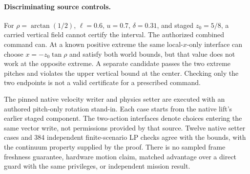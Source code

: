 \documentclass{article}
\begin{document}
\paragraph{Discriminating source controls.}
For $\rho=\arctan(1/2)$, $\ell=0.6$, $u=0.7$,
$\delta=0.31$, and staged $z_0=5/8$, a carried vertical field
cannot certify the interval. The authorized combined command
can. At a known positive extreme the same local-$x$-only
interface can choose $x=-z_0\tan\rho$ and satisfy both world
bounds, but that value does not work at the opposite extreme.
A separate candidate passes the two extreme pitches and violates
the upper vertical bound at the center. Checking only the two
endpoints is not a valid certificate for a prescribed command.

The pinned native velocity writer and physics setter are executed
with an authored pitch-only rotation stand-in. Each case starts
from the native lift's earlier staged component. The two-action
interfaces denote choices entering the same vector write, not
permissions provided by that source. Twelve native setter cases
and 384 independent finite-scenario LP checks agree with the
bounds, with the continuum property supplied by the proof.
There is no sampled frame freshness guarantee, hardware motion
claim, matched advantage over a direct guard with the same
privileges, or independent mission result.
\end{document}
